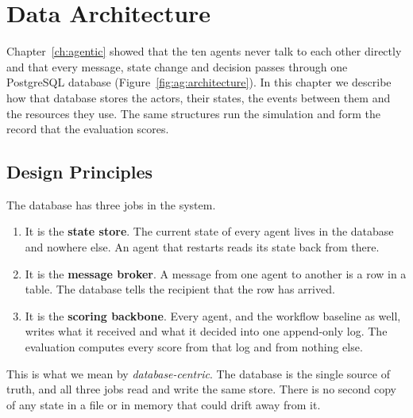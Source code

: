 \chapter{Data Architecture}
\label{ch:data}


Chapter~\ref{ch:agentic} showed that the ten agents never talk to each other
directly and that every message, state change and decision passes through one
PostgreSQL database (Figure~\ref{fig:ag:architecture}). In this chapter we
describe how that database stores the actors, their states, the events between
them and the resources they use. The same structures run the simulation and
form the record that the evaluation scores.

\section{Design Principles}
\label{sec:data:principles}

The database has three jobs in the system.
\begin{enumerate}
  \item It is the \textbf{state store}. The current state of every agent lives
  in the database and nowhere else. An agent that restarts reads its state back
  from there.
  \item It is the \textbf{message broker}. A message from one agent to another
  is a row in a table. The database tells the recipient that the row has
  arrived.
  \item It is the \textbf{scoring backbone}. Every agent, and the workflow
  baseline as well, writes what it received and what it decided into one
  append-only log. The evaluation computes every score from that log and from
  nothing else.
\end{enumerate}
This is what we mean by \emph{database-centric}. The database is the single
source of truth, and all three jobs read and write the same store. There is no
second copy of any state in a file or in memory that could drift away from it.

